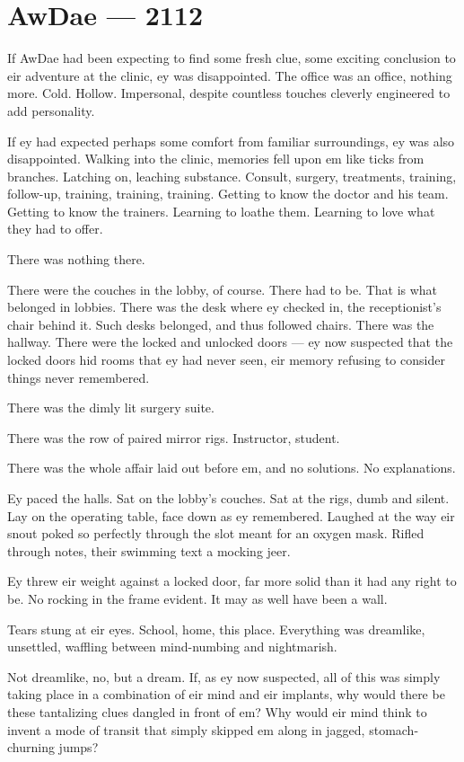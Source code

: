 \hypertarget{rj-brewster-2112}{%
\chapter*{AwDae — 2112}\label{rj-brewster-2112}}

If AwDae had been expecting to find some fresh clue, some exciting conclusion to eir adventure at the clinic, ey was disappointed. The office was an office, nothing more. Cold. Hollow. Impersonal, despite countless touches cleverly engineered to add personality.

If ey had expected perhaps some comfort from familiar surroundings, ey was also disappointed. Walking into the clinic, memories fell upon em like ticks from branches. Latching on, leaching substance. Consult, surgery, treatments, training, follow-up, training, training, training. Getting to know the doctor and his team. Getting to know the trainers. Learning to loathe them. Learning to love what they had to offer.

There was nothing there.

There were the couches in the lobby, of course. There had to be. That is what belonged in lobbies. There was the desk where ey checked in, the receptionist's chair behind it. Such desks belonged, and thus followed chairs. There was the hallway. There were the locked and unlocked doors — ey now suspected that the locked doors hid rooms that ey had never seen, eir memory refusing to consider things never remembered.

There was the dimly lit surgery suite.

There was the row of paired mirror rigs. Instructor, student.

There was the whole affair laid out before em, and no solutions. No explanations.

Ey paced the halls. Sat on the lobby's couches. Sat at the rigs, dumb and silent. Lay on the operating table, face down as ey remembered. Laughed at the way eir snout poked so perfectly through the slot meant for an oxygen mask. Rifled through notes, their swimming text a mocking jeer.

Ey threw eir weight against a locked door, far more solid than it had any right to be. No rocking in the frame evident. It may as well have been a wall.

Tears stung at eir eyes. School, home, this place. Everything was dreamlike, unsettled, waffling between mind-numbing and nightmarish.

Not dreamlike, no, but a dream. If, as ey now suspected, all of this was simply taking place in a combination of eir mind and eir implants, why would there be these tantalizing clues dangled in front of em? Why would eir mind think to invent a mode of transit that simply skipped em along in jagged, stomach-churning jumps?

